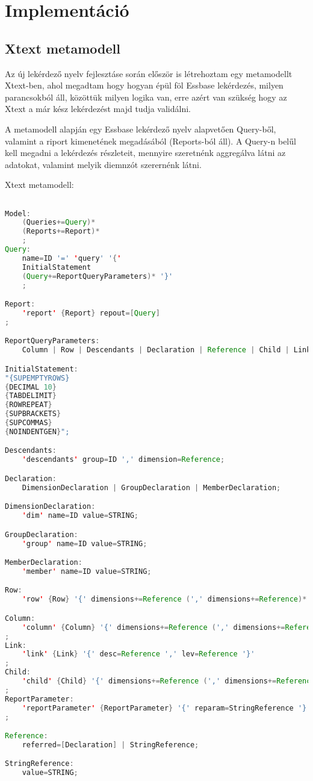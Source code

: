 \chapter{Implementáció}\label{sect:Ellaboration}
\section{Xtext metamodell}
Az új lekérdező nyelv fejlesztáse során először is létrehoztam egy metamodellt
Xtext-ben, ahol megadtam hogy hogyan épül föl Essbase lekérdezés, milyen
parancsokból áll, közöttük milyen logika van, erre azért van szükség hogy az
Xtext a már kész lekérdezést majd tudja validálni.

A metamodell alapján egy Essbase lekérdező nyelv alapvetően Query-ből,
valamint a riport kimenetének megadásából (Reports-ból áll). A Query-n belűl
kell megadni a lekérdezés részleteit, mennyire szeretnénk aggregálva látni az
adatokat, valamint melyik diemnzót szerernénk látni.

Xtext metamodell:
\begin{lstlisting}[language=java,morekeywords={generate,dim,group,row,link,reportParameter,report,query},alsoletter={-},breaklines=true]

Model:
	(Queries+=Query)*
	(Reports+=Report)*
	;
Query:
	name=ID '=' 'query' '{'
	InitialStatement
	(Query+=ReportQueryParameters)* '}'
	;

Report:
	'report' {Report} repout=[Query]
;

ReportQueryParameters:
	Column | Row | Descendants | Declaration | Reference | Child | Link | ReportParameter;

InitialStatement:
"{SUPEMPTYROWS}
{DECIMAL 10}
{TABDELIMIT}
{ROWREPEAT}
{SUPBRACKETS}
{SUPCOMMAS}
{NOINDENTGEN}";

Descendants:
	'descendants' group=ID ',' dimension=Reference;

Declaration:
	DimensionDeclaration | GroupDeclaration | MemberDeclaration;

DimensionDeclaration:
	'dim' name=ID value=STRING;

GroupDeclaration:
	'group' name=ID value=STRING;

MemberDeclaration:
	'member' name=ID value=STRING;

Row:
	'row' {Row} '{' dimensions+=Reference (',' dimensions+=Reference)* '}';

Column:
	'column' {Column} '{' dimensions+=Reference (',' dimensions+=Reference)* '}'
; 	
Link:
	'link' {Link} '{' desc=Reference ',' lev=Reference '}'
; 	
Child:
	'child' {Child} '{' dimensions+=Reference (',' dimensions+=Reference)* '}'
; 	
ReportParameter:
	'reportParameter' {ReportParameter} '{' reparam=StringReference '}'
;

Reference:
	referred=[Declaration] | StringReference;

StringReference:
	value=STRING;
\end{lstlisting}

